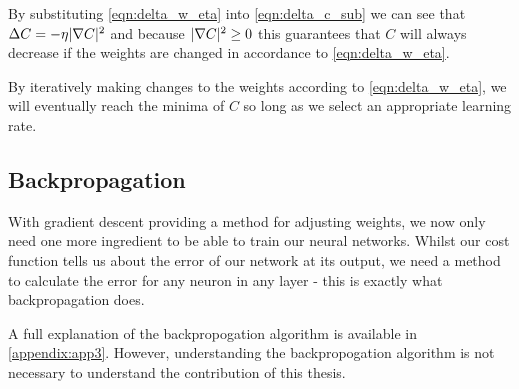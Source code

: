 By substituting \autoref{eqn:delta_w_eta} into \autoref{eqn:delta_c_sub} we can see that $ \Delta C = - \eta \lvert\nabla C\rvert^2$ and because $\lvert\nabla C\rvert^2 \geq 0$ this guarantees that $C$ will always decrease if the weights are changed in accordance to \autoref{eqn:delta_w_eta}.

By iteratively making changes to the weights according to \autoref{eqn:delta_w_eta}, we will eventually reach the minima of $C$ so long as we select an appropriate learning rate.

\subsection{Backpropagation}
With gradient descent providing a method for adjusting  weights, we now only need one more ingredient to be able to train our neural networks. Whilst our cost function tells us about the error of our network at its output, we need a method to calculate the error for any neuron in any layer - this is exactly what backpropagation does. 

A full explanation of the backpropogation algorithm is available in \autoref{appendix:app3}. However, understanding the backpropogation algorithm is not necessary to understand the contribution of this thesis.


